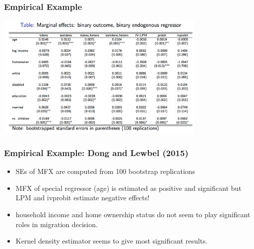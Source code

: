 \documentclass[11pt,dvipsnames,table,aspectratio=169]{beamer}
\begin{document}
\begin{frame}
\frametitle{Empirical Example}
\begin{center}
\includegraphics[width=4in]{resources/specialregtable.png}
\end{center}
\end{frame}

\begin{frame}
\frametitle{Empirical Example: Dong and Lewbel (2015)}

\begin{itemize}
\item SEs of MFX are computed from 100 bootstrap replications
\item MFX of special regressor (age) is estimated as positive and significant but LPM and ivprobit estimate negative effects!
\item household income and home ownership status do not seem to play significant roles in migration decision.
\item Kernel density estimator seems to give most significant results.
\end{itemize}
\end{frame}


%        

          
\end{document}
